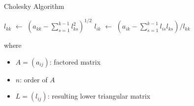 \documentclass[9pt, serif]{beamer}
\newlength{\wideitemsep}
\let\olditem\item
\renewcommand{\item}{\setlength{\itemsep}{\wideitemsep}\olditem}
\newcommand{\bi}{\begin{itemize}}
\newcommand{\ei}{\end{itemize}}
\newcommand*\Let[2]{\State #1 $\gets$ #2}
\begin{document}
\begin{frame}{Cholesky Algorithm}
 \begin{algorithmic}[1]
                \Let{$l_{kk}$}{$\left(a_{kk}-\sum\limits_{s=1}^{k-1}l_{ks}^2\right)^{1/2}$}
                    \Let{$l_{ik}$}{$\left(a_{ik}-\sum\limits_{s=1}^{k-1}l_{is}l_{ks}\right)/l_{kk}$}
                \EndFor
            \EndFor
            \vspace{-5mm}
            \State {}
        \EndFunction
    \end{algorithmic}
    \vspace{2mm}
    where
    \vspace{2mm}
    \bi
        \item $A = (a_{ij})$: factored matrix
        \item $n$: order of $A$
        \item $L = (l_{ij})$: resulting lower triangular matrix
    \ei
\end{frame}
\end{document}
